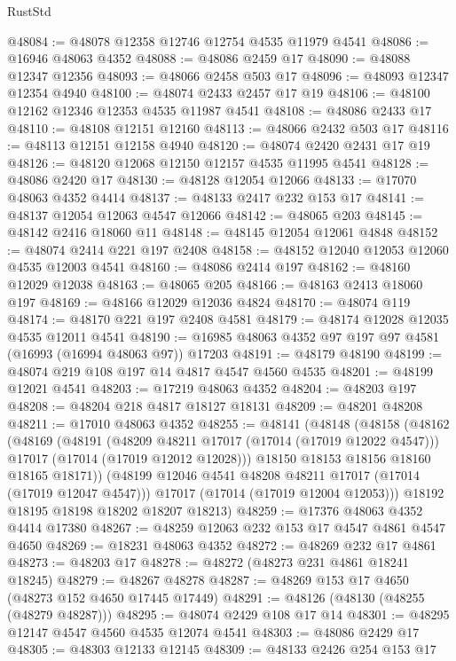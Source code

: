 \begin{lexlean}{RustStd}
\begin{coremodule}
{\begin{coremodule}
{{{{{{{{{{{{{{{{{{{{{{{{{{{{{{{{{{{{{{{{{{{{{{{{{{{{{{{@48084 := @48078 @12358 @12746 @12754 @4535 @11979 @4541
@48086 := @16946 @48063 @4352
@48088 := @48086 @2459 @17
@48090 := @48088 @12347 @12356
@48093 := @48066 @2458 @503 @17
@48096 := @48093 @12347 @12354 @4940
@48100 := @48074 @2433 @2457 @17 @19
@48106 := @48100 @12162 @12346 @12353 @4535 @11987 @4541
@48108 := @48086 @2433 @17
@48110 := @48108 @12151 @12160
@48113 := @48066 @2432 @503 @17
@48116 := @48113 @12151 @12158 @4940
@48120 := @48074 @2420 @2431 @17 @19
@48126 := @48120 @12068 @12150 @12157 @4535 @11995 @4541
@48128 := @48086 @2420 @17
@48130 := @48128 @12054 @12066
@48133 := @17070 @48063 @4352 @4414
@48137 := @48133 @2417 @232 @153 @17
@48141 := @48137 @12054 @12063 @4547 @12066
@48142 := @48065 @203
@48145 := @48142 @2416 @18060 @11
@48148 := @48145 @12054 @12061 @4848
@48152 := @48074 @2414 @221 @197 @2408
@48158 := @48152 @12040 @12053 @12060 @4535 @12003 @4541
@48160 := @48086 @2414 @197
@48162 := @48160 @12029 @12038
@48163 := @48065 @205
@48166 := @48163 @2413 @18060 @197
@48169 := @48166 @12029 @12036 @4824
@48170 := @48074 @119
@48174 := @48170 @221 @197 @2408 @4581
@48179 := @48174 @12028 @12035 @4535 @12011 @4541
@48190 := @16985 @48063 @4352 @97 @197 @97 @4581 (@16993 (@16994 @48063 @97)) @17203
@48191 := @48179 @48190
@48199 := @48074 @219 @108 @197 @14 @4817 @4547 @4560 @4535
@48201 := @48199 @12021 @4541
@48203 := @17219 @48063 @4352
@48204 := @48203 @197
@48208 := @48204 @218 @4817 @18127 @18131
@48209 := @48201 @48208
@48211 := @17010 @48063 @4352
@48255 := @48141
    (@48148
      (@48158
        (@48162
          (@48169
            (@48191
              (@48209 @48211 @17017 (@17014 (@17019 @12022 @4547)))
              @17017
              (@17014 (@17019 @12012 @12028)))
            @18150
            @18153
            @18156
            @18160
            @18165
            @18171))
        (@48199 @12046 @4541 @48208 @48211 @17017 (@17014 (@17019 @12047 @4547)))
        @17017
        (@17014 (@17019 @12004 @12053)))
      @18192
      @18195
      @18198
      @18202
      @18207
      @18213)
@48259 := @17376 @48063 @4352 @4414 @17380
@48267 := @48259 @12063 @232 @153 @17 @4547 @4861 @4547 @4650
@48269 := @18231 @48063 @4352
@48272 := @48269 @232 @17 @4861
@48273 := @48203 @17
@48278 := @48272 (@48273 @231 @4861 @18241 @18245)
@48279 := @48267 @48278
@48287 := @48269 @153 @17 @4650 (@48273 @152 @4650 @17445 @17449)
@48291 := @48126 (@48130 (@48255 (@48279 @48287)))
@48295 := @48074 @2429 @108 @17 @14
@48301 := @48295 @12147 @4547 @4560 @4535 @12074 @4541
@48303 := @48086 @2429 @17
@48305 := @48303 @12133 @12145
@48309 := @48133 @2426 @254 @153 @17
}}}}}}}}}}}}}}}}}}}}}}}}}}}}}}}}}}}}}}}}}}}}}}}}}}}}}}}
\end{coremodule}}
\end{coremodule}
\end{lexlean}
